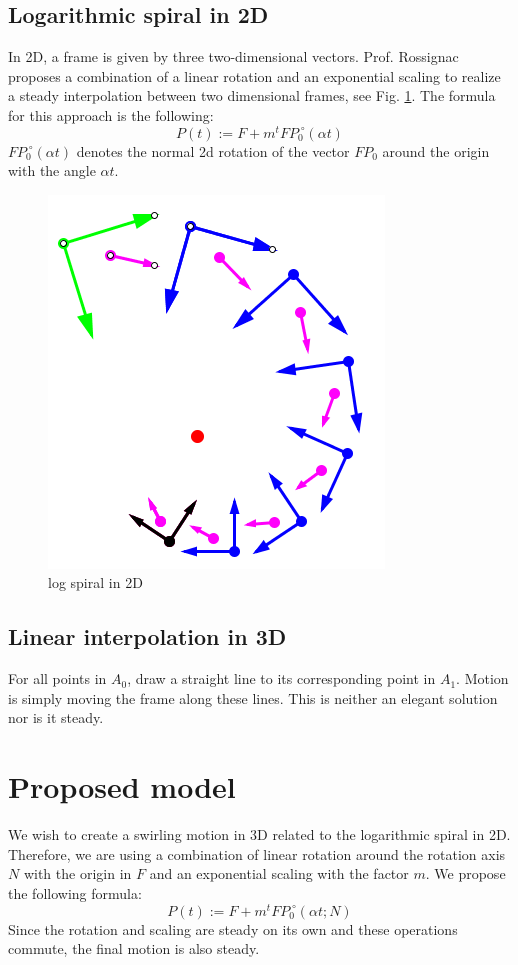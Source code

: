 \documentclass[journal, letterpaper]{IEEEtran}
\begin{document}
\subsection{Logarithmic spiral in 2D}
In 2D, a frame is given by three two-dimensional vectors. Prof. Rossignac proposes a combination of a linear rotation and an exponential scaling to realize a steady interpolation between two dimensional frames, see Fig. \ref{fig:P6}.
The formula for this approach is the following:
\begin{equation}
 P(t) := F + m^t FP_0 ^{\;\circ} (\alpha t)
\label{eq:logSpiral}
\end{equation}
$FP_0 ^{\;\circ} (\alpha t)$ denotes the normal 2d rotation of the vector $FP_0$ around the origin with the angle $\alpha t$.
\begin{figure}
	\centering
		\includegraphics[scale=0.4]{pictures/P6.png}
	\caption{log spiral in 2D}
	\label{fig:P6}
\end{figure}

\subsection{Linear interpolation in 3D}
For all points in $A_0$, draw a straight line to its corresponding point in $A_1$. Motion is simply moving the frame along these lines.  This is neither an elegant solution nor is it steady.

\section{Proposed model}
We wish to create a swirling motion in 3D related to the logarithmic spiral in 2D. Therefore, we are using a combination of linear rotation around the rotation axis $N$ with the origin in $F$ and an exponential scaling with the factor $m$. We propose the following formula:
\begin{equation}
 P(t) := F + m^t FP_0 ^{\;\circ} (\alpha t; N)
\label{eq:Interpolation}
\end{equation}
Since the rotation and scaling are steady on its own and these operations commute, the final motion is also steady.
\end{document}
